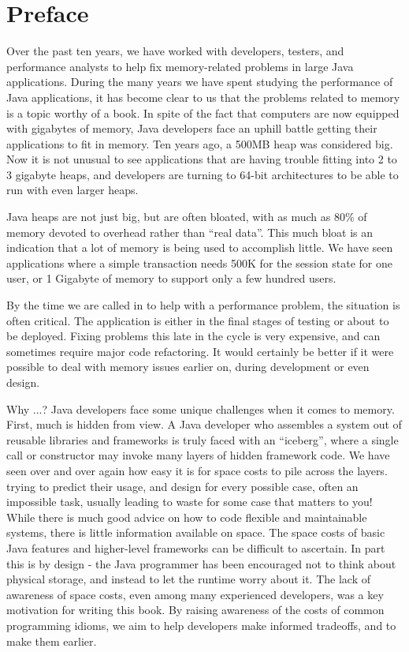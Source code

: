 \chapter*{Preface}
\label{chapter:preface}

Over the past ten years, we have worked with developers, testers, and
performance analysts to help fix memory-related problems in large Java
applications.  During the many years we have spent studying the performance of
Java applications, it has become clear to us that the problems related to memory
is a topic worthy of a book. In spite of the fact that computers are now
equipped with gigabytes of memory, Java developers face an uphill battle getting
their applications to fit in memory. Ten years ago, a 500MB heap was considered
big. Now it is not unusual to see applications that are having trouble fitting
into 2 to 3 gigabyte heaps, and developers are turning to 64-bit architectures
to be able to run with even larger heaps.

Java heaps are not just big, but are often bloated, with as much as 80\% of
memory devoted to overhead rather than "`real data"'. This much bloat is an
indication that a lot of memory is being used to accomplish little. We have seen
applications where a simple transaction needs 500K for the session state for one
user, or 1 Gigabyte of memory to support only a few hundred users.

By the time we are called in to help with a performance problem, the situation
is often critical. The application is either in the final stages of testing or
about to be deployed. Fixing problems this late in the cycle is very expensive,
and can sometimes require major code refactoring. It would certainly be better
if it were possible to deal with memory issues earlier on, during development or
even design.

Why ...? Java developers face some unique challenges when it comes to memory.
First, much is hidden from view. A Java developer who assembles a system out of
reusable libraries and frameworks is truly faced with an "`iceberg"', where a
single call or constructor may invoke many layers of hidden framework code. We
have seen over and over again how easy it is for space costs to pile across the
layers. %
trying to predict their usage, and design for every possible case, often an
impossible task, usually leading to waste for some case that matters to you!
While there is much good advice on how to code flexible and maintainable
systems, there is little information available on space. The space costs of
basic Java features and higher-level frameworks can be difficult to ascertain.
In part this is by design - the Java programmer has been encouraged not to think
about physical storage, and instead to let the runtime worry about it. The lack
of awareness of space costs, even among many experienced developers, was a key
motivation for writing this book. By raising awareness of the costs of common
programming idioms, we aim to help developers make informed tradeoffs, and to
make them earlier.

